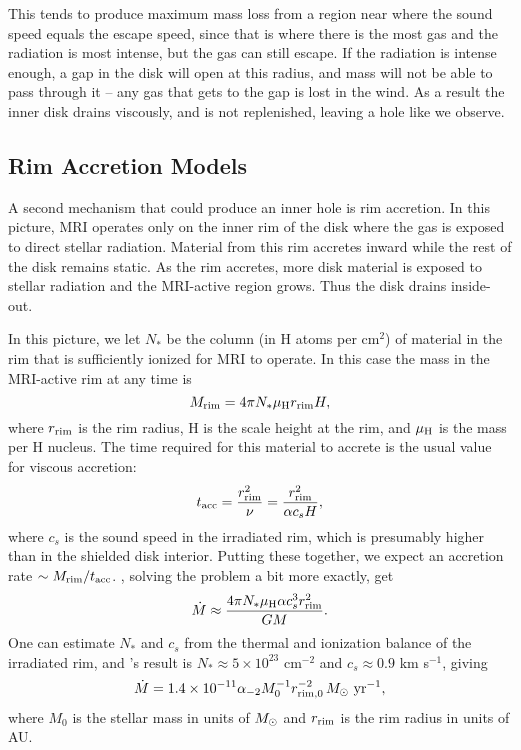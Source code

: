 This tends to produce maximum mass loss from a region near where the sound speed equals the escape speed, since that is where there is the most gas and the radiation is most intense, but the gas can still escape. If the radiation is intense enough, a gap in the disk will open at this radius, and mass will not be able to pass through it -- any gas that gets to the gap is lost in the wind. As a result the inner disk drains viscously, and is not replenished, leaving a hole like we observe.

\subsection{Rim Accretion Models}

A second mechanism that could produce an inner hole is rim accretion. In this picture, MRI operates only on the inner rim of the disk where the gas is exposed to direct stellar radiation. Material from this rim accretes inward while the rest of the disk remains static. As the rim accretes, more disk material is exposed to stellar radiation and the MRI-active region grows. Thus the disk drains inside-out.

In this picture, we let $N_*$ be the column (in H atoms per cm$^2$) of material in the rim that is sufficiently ionized for MRI to operate. In this case the mass in the MRI-active rim at any time is
\begin{equation}
M_{\rm rim} = 4\pi N_* \mu_{\rm H} r_{\rm rim} H,
\end{equation}
where $r_{\rm rim}$ is the rim radius, H is the scale height at the rim, and $\mu_{\rm H}$ is the mass per H nucleus. The time required for this material to accrete is the usual value for viscous accretion:
\begin{equation}
t_{\rm acc} = \frac{r_{\rm rim}^2}{\nu} = \frac{r_{\rm rim}^2}{\alpha c_s H},
\end{equation}
where $c_s$ is the sound speed in the irradiated rim, which is presumably higher than in the shielded disk interior. Putting these together, we expect an accretion rate $\sim M_{\rm rim}/t_{\rm acc}$. \citet{chiang07a}, solving the problem a bit more exactly, get
\begin{equation}
\dot{M} \approx \frac{4\pi N_* \mu_{\rm H} \alpha c_s^3 r_{\rm rim}^2}{G M}.
\end{equation}
One can estimate $N_*$ and $c_s$ from the thermal and ionization balance of the irradiated rim, and \citet{chiang07a}'s result is $N_* \approx 5\times 10^{23}$ cm$^{-2}$ and $c_s \approx 0.9$ km s$^{-1}$, giving
\begin{equation}
\dot{M} = 1.4\times 10^{-11} \alpha_{-2} M_0^{-1} r_{\rm rim,0}^{-2} \,M_{\odot}\mbox{ yr}^{-1},
\end{equation} 
where $M_0$ is the stellar mass in units of $M_{\odot}$ and $r_{\rm rim}$ is the rim radius in units of AU.

